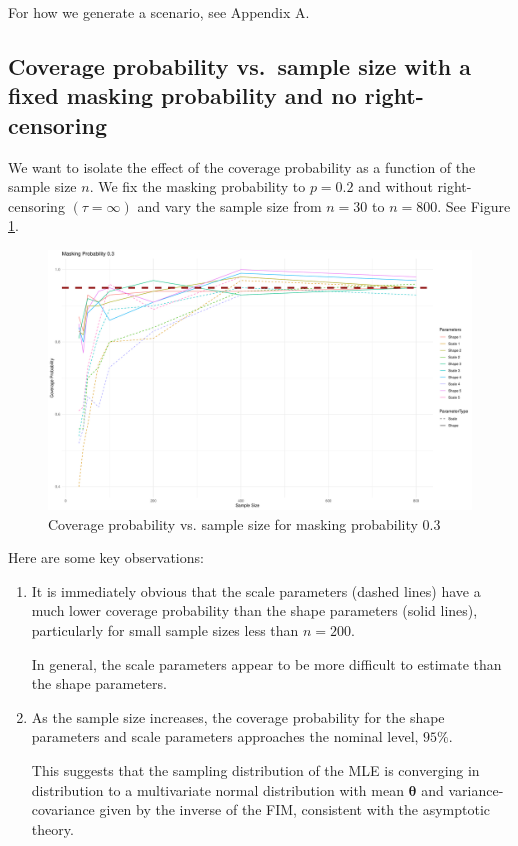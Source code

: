 \documentclass[
]{article}
\begin{document}
For how we generate a scenario, see Appendix A.

\hypertarget{coverage-probability-vs.-sample-size-with-a-fixed-masking-probability-and-no-right-censoring}{%
\subsection{Coverage probability vs.~sample size with a fixed masking
probability and no
right-censoring}\label{coverage-probability-vs.-sample-size-with-a-fixed-masking-probability-and-no-right-censoring}}

We want to isolate the effect of the coverage probability as a function
of the sample size \(n\). We fix the masking probability to \(p = 0.2\)
and without right-censoring \((\tau = \infty)\) and vary the sample size
from \(n = 30\) to \(n = 800\). See Figure
\ref{fig:plot-coverage-p-three-vs-sample-size}.

\begin{figure}

{\centering \includegraphics{image/plot-coverage-p_0.3-vs-sample-size} 

}

\caption{Coverage probability vs. sample size for masking probability $0.3$}\label{fig:plot-coverage-p-three-vs-sample-size}
\end{figure}

Here are some key observations:

\begin{enumerate}
\def\labelenumi{\arabic{enumi}.}
\item
  It is immediately obvious that the scale parameters (dashed lines)
  have a much lower coverage probability than the shape parameters
  (solid lines), particularly for small sample sizes less than
  \(n = 200\).

  In general, the scale parameters appear to be more difficult to
  estimate than the shape parameters.
\item
  As the sample size increases, the coverage probability for the shape
  parameters and scale parameters approaches the nominal level,
  \(95\%\).

  This suggests that the sampling distribution of the MLE is converging
  in distribution to a multivariate normal distribution with mean
  \(\boldsymbol{\theta}\) and variance-covariance given by the inverse
  of the FIM, consistent with the asymptotic theory.
\end{enumerate}
\end{document}
